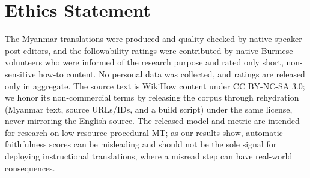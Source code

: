 \documentclass[11pt]{article}
\begin{document}
\section*{Ethics Statement}
The Myanmar translations were produced and quality-checked by native-speaker post-editors,
and the followability ratings were contributed by native-Burmese volunteers who were informed
of the research purpose and rated only short, non-sensitive how-to content. No personal data
was collected, and ratings are released only in aggregate. The source text is WikiHow content
under CC BY-NC-SA 3.0; we honor its non-commercial terms by releasing the corpus through
rehydration (Myanmar text, source URLs/IDs, and a build script) under the same license, never
mirroring the English source. The released model and metric are intended for research on
low-resource procedural MT; as our results show, automatic faithfulness scores can be
misleading and should not be the sole signal for deploying instructional translations, where
a misread step can have real-world consequences.


\end{document}
